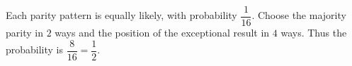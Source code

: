 Each parity pattern is equally likely, with probability $\dfrac{1}{16}$. Choose the majority parity in $2$ ways and the position of the exceptional result in $4$ ways. Thus the probability is $\dfrac{8}{16}=\boxed{\dfrac{1}{2}}$.
